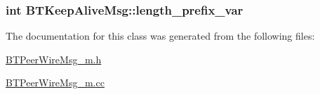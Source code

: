 \subsubsection[{length\+\_\+prefix\+\_\+var}]{\setlength{\rightskip}{0pt plus 5cm}int B\+T\+Keep\+Alive\+Msg\+::length\+\_\+prefix\+\_\+var\hspace{0.3cm}{\ttfamily [protected]}}\label{classBTKeepAliveMsg_a966d742d7272d0ae62f7954fa2607644}


The documentation for this class was generated from the following files\+:\begin{DoxyCompactItemize}
\item 
\hyperlink{BTPeerWireMsg__m_8h}{B\+T\+Peer\+Wire\+Msg\+\_\+m.\+h}\item 
\hyperlink{BTPeerWireMsg__m_8cc}{B\+T\+Peer\+Wire\+Msg\+\_\+m.\+cc}\end{DoxyCompactItemize}
